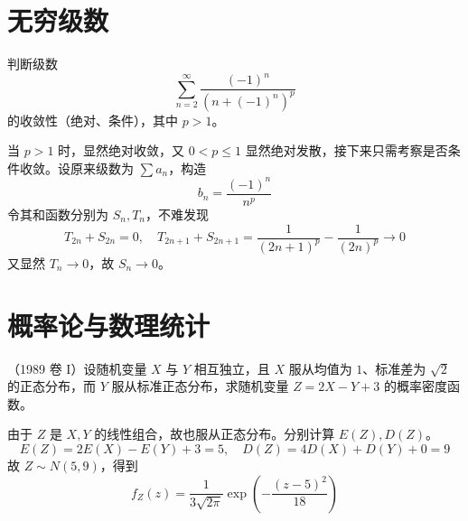 \section{无穷级数}

\begin{problem}[000065]
判断级数
\[ \sum_{n=2}^{\infty} \frac{(-1)^n}{\left(n + (-1)^n\right)^p} \]
的收敛性（绝对、条件），其中 $p > 1$。
\end{problem}

\begin{solution}
当 $p > 1$ 时，显然绝对收敛，又 $0 < p \leqslant 1$ 显然绝对发散，接下来只需考察是否条件收敛。设原来级数为 $\sum a_n$，构造
\[ b_n = \frac{(-1)^n}{n^p} \]
令其和函数分别为 $S_n, T_n$，不难发现
\[ T_{2n} + S_{2n} = 0, \quad T_{2n+1} + S_{2n+1} = \frac{1}{(2n+1)^p} - \frac{1}{(2n)^p} \to 0 \]
又显然 $T_n \to 0$，故 $S_n \to 0$。
\end{solution}


\section{概率论与数理统计}

\begin{problem}[000062]
（1989 卷 I）设随机变量 $X$ 与 $Y$ 相互独立，且 $X$ 服从均值为 $1$、标准差为 $\sqrt{2}$ 的正态分布，而 $Y$ 服从标准正态分布，求随机变量 $Z = 2X - Y + 3$ 的概率密度函数。
\end{problem}

\begin{solution}
	由于 $Z$ 是 $X, Y$ 的线性组合，故也服从正态分布。分别计算 $E(Z), D(Z)$。
	\[ E(Z) = 2 E(X) - E(Y) + 3 = 5, \quad D(Z) = 4D(X) + D(Y) + 0 = 9 \]
	故 $Z \sim N(5, 9)$，得到
	\[ f_Z(z) = \frac{1}{3 \sqrt{2 \pi}} \exp\left(- \frac{(z-5)^2}{18 }\right) \]
\end{solution}
